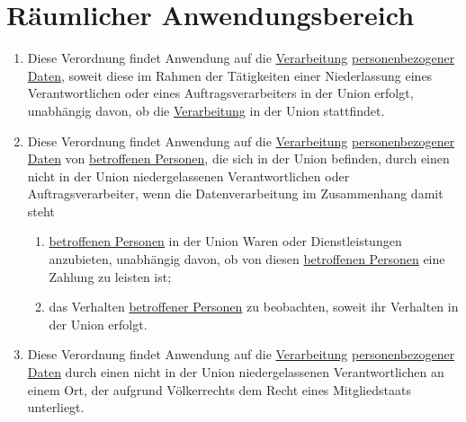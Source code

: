 \chapter{Räumlicher Anwendungsbereich}
\label{ch:3}


\begin{enumerate}

  \item Diese Verordnung findet Anwendung auf die \hyperref[itm:04-2]{Verarbeitung} \hyperref[itm:04-1]{personenbezogener Daten}, soweit
   diese im Rahmen der Tätigkeiten einer Niederlassung eines Verantwortlichen oder eines Auftragsverarbeiters in der
   Union erfolgt, unabhängig davon, ob die \hyperref[itm:04-2]{Verarbeitung} in der Union stattfindet.
  \label{itm:03-1}

  \item Diese Verordnung findet Anwendung auf die \hyperref[itm:04-2]{Verarbeitung} \hyperref[itm:04-1]{personenbezogener Daten} von
   \hyperref[itm:04-1]{betroffenen Personen}, die sich in der Union befinden, durch einen nicht in der Union niedergelassenen
   Verantwortlichen oder Auftragsverarbeiter, wenn die Datenverarbeitung im Zusammenhang damit steht
  \label{itm:03-2}

  \begin{enumerate}
  
    \item \hyperref[itm:04-1]{betroffenen Personen} in der Union Waren oder Dienstleistungen anzubieten, unabhängig davon, ob von diesen
     \hyperref[itm:04-1]{betroffenen Personen} eine Zahlung zu leisten ist;
    \label{itm:03-2a}

    \item das Verhalten \hyperref[itm:04-1]{betroffener Personen} zu beobachten, soweit ihr Verhalten in der Union erfolgt.
    \label{itm:03-2b}

  \end{enumerate}

  \item Diese Verordnung findet Anwendung auf die \hyperref[itm:04-2]{Verarbeitung} \hyperref[itm:04-1]{personenbezogener Daten} durch einen
   nicht in der Union niedergelassenen Verantwortlichen an einem Ort, der aufgrund Völkerrechts dem Recht eines
   Mitgliedstaats unterliegt.
  \label{itm:03-3}

\end{enumerate}


